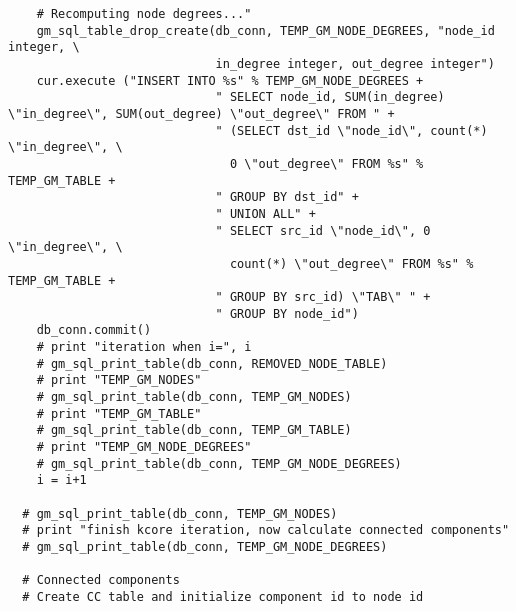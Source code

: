 \begin{lstlisting}
    # Recomputing node degrees..."
    gm_sql_table_drop_create(db_conn, TEMP_GM_NODE_DEGREES, "node_id integer, \
                             in_degree integer, out_degree integer")
    cur.execute ("INSERT INTO %s" % TEMP_GM_NODE_DEGREES +
                             " SELECT node_id, SUM(in_degree) \"in_degree\", SUM(out_degree) \"out_degree\" FROM " +
                             " (SELECT dst_id \"node_id\", count(*) \"in_degree\", \
                               0 \"out_degree\" FROM %s" % TEMP_GM_TABLE +
                             " GROUP BY dst_id" +
                             " UNION ALL" +
                             " SELECT src_id \"node_id\", 0 \"in_degree\", \
                               count(*) \"out_degree\" FROM %s" % TEMP_GM_TABLE +
                             " GROUP BY src_id) \"TAB\" " +
                             " GROUP BY node_id")
    db_conn.commit()
    # print "iteration when i=", i
    # gm_sql_print_table(db_conn, REMOVED_NODE_TABLE)
    # print "TEMP_GM_NODES"
    # gm_sql_print_table(db_conn, TEMP_GM_NODES)
    # print "TEMP_GM_TABLE"
    # gm_sql_print_table(db_conn, TEMP_GM_TABLE)
    # print "TEMP_GM_NODE_DEGREES"
    # gm_sql_print_table(db_conn, TEMP_GM_NODE_DEGREES)
    i = i+1

  # gm_sql_print_table(db_conn, TEMP_GM_NODES)
  # print "finish kcore iteration, now calculate connected components"
  # gm_sql_print_table(db_conn, TEMP_GM_NODE_DEGREES)

  # Connected components
  # Create CC table and initialize component id to node id


\end{lstlisting}
